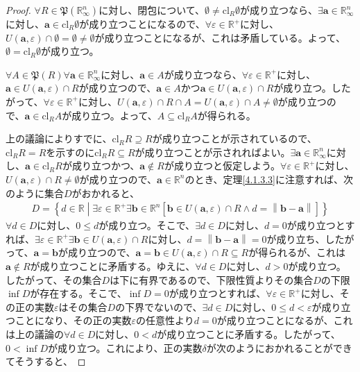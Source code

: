 \documentclass[dvipdfmx]{jsarticle}
\begin{document}
\begin{proof}
$\forall R \in \mathfrak{P}\left( \mathbb{R}_{\infty}^{n} \right)$に対し、閉包について、$\emptyset \neq \mathrm{cl}_{R}\emptyset$が成り立つなら、$\exists\mathbf{a} \in \mathbb{R}_{\infty}^{n}$に対し、$\mathbf{a} \in \mathrm{cl}_{R}\emptyset$が成り立つことになるので、$\forall\varepsilon \in \mathbb{R}^{+}$に対し、$U\left( \mathbf{a},\varepsilon \right) \cap \emptyset = \emptyset \neq \emptyset$が成り立つことになるが、これは矛盾している。よって、$\emptyset = \mathrm{cl}_{R}\emptyset$が成り立つ。\par
$\forall A \in \mathfrak{P}(R)\forall\mathbf{a} \in \mathbb{R}_{\infty}^{n}$に対し、$\mathbf{a} \in A$が成り立つなら、$\forall\varepsilon \in \mathbb{R}^{+}$に対し、$\mathbf{a} \in U\left( \mathbf{a},\varepsilon \right) \cap R$が成り立つので、$\mathbf{a} \in A$かつ$\mathbf{a} \in U\left( \mathbf{a},\varepsilon \right) \cap R$が成り立つ。したがって、$\forall\varepsilon \in \mathbb{R}^{+}$に対し、$U\left( \mathbf{a},\varepsilon \right) \cap R \cap A = U\left( \mathbf{a},\varepsilon \right) \cap A \neq \emptyset$が成り立つので、$\mathbf{a} \in \mathrm{cl}_{R}A$が成り立つ。よって、$A \subseteq \mathrm{cl}_{R}A$が得られる。\par
上の議論によりすでに、$\mathrm{cl}_{R}R \supseteq R$が成り立つことが示されているので、$\mathrm{cl}_{R}R = R$を示すのに$\mathrm{cl}_{R}R \subseteq R$が成り立つことが示されればよい。$\exists\mathbf{a} \in \mathbb{R}_{\infty}^{n}$に対し、$\mathbf{a} \in \mathrm{cl}_{R}R$が成り立つかつ、$\mathbf{a} \notin R$が成り立つと仮定しよう。$\forall\varepsilon \in \mathbb{R}^{+}$に対し、$U\left( \mathbf{a},\varepsilon \right) \cap R \neq \emptyset$が成り立つので、$\mathbf{a} \in \mathbb{R}^{n}$のとき、定理\ref{4.1.3.3}に注意すれば、次のように集合$D$がおかれると、
\begin{align*}
D = \left\{ d \in \mathbb{R} \middle| \exists\varepsilon \in \mathbb{R}^{+}\exists\mathbf{b} \in \mathbb{R}^{n}\left[ \mathbf{b} \in U\left( \mathbf{a},\varepsilon \right) \cap R \land d = \left\| \mathbf{b} - \mathbf{a} \right\| \right] \right\}
\end{align*}
$\forall d \in D$に対し、$0 \leq d$が成り立つ。そこで、$\exists d \in D$に対し、$d = 0$が成り立つとすれば、$\exists\varepsilon \in \mathbb{R}^{+}\exists\mathbf{b} \in U\left( \mathbf{a},\varepsilon \right) \cap R$に対し、$d = \left\| \mathbf{b} - \mathbf{a} \right\| = 0$が成り立ち、したがって、$\mathbf{a} = \mathbf{b}$が成り立つので、$\mathbf{a} = \mathbf{b} \in U\left( \mathbf{a},\varepsilon \right) \cap R \subseteq R$が得られるが、これは$\mathbf{a} \notin R$が成り立つことに矛盾する。ゆえに、$\forall d \in D$に対し、$d > 0$が成り立つ。したがって、その集合$D$は下に有界であるので、下限性質よりその集合$D$の下限$\inf D$が存在する。そこで、$\inf D = 0$が成り立つとすれば、$\forall\varepsilon \in \mathbb{R}^{+}$に対し、その正の実数$\varepsilon$はその集合$D$の下界でないので、$\exists d \in D$に対し、$0 \leq d < \varepsilon$が成り立つことになり、その正の実数$\varepsilon$の任意性より$d = 0$が成り立つことになるが、これは上の議論の$\forall d \in D$に対し、$0 < d$が成り立つことに矛盾する。したがって、$0 < \inf D$が成り立つ。これにより、正の実数$\delta$が次のようにおかれることができてそうすると、

\end{proof}
\end{document}

